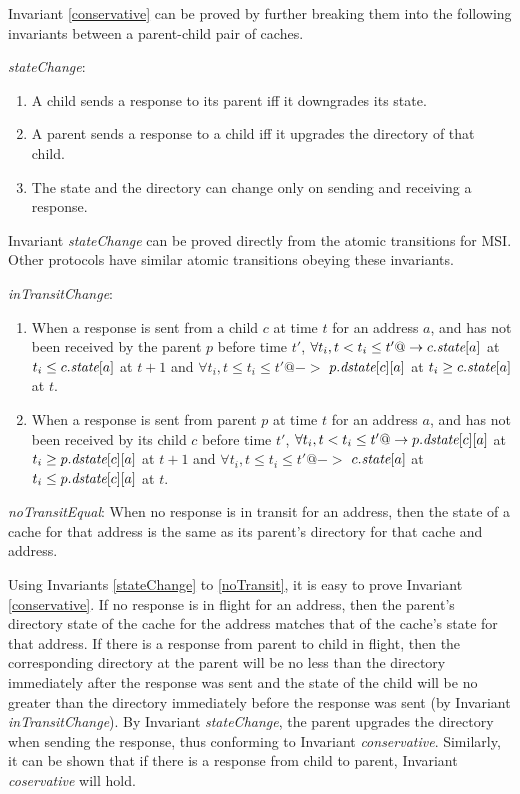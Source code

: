 Invariant \ref{conservative} can be proved by
further breaking them into the following invariants between a parent-child pair
of caches.

\begin{inv}
\textit{stateChange}:
\begin{enumerate}
\item A child sends a response to its parent iff it downgrades its state.
\item A parent sends a response to a child iff it upgrades the directory of
that child.
\item The state and the directory can change only on sending and receiving a
response.
\end{enumerate}
\label{stateChange}
\end{inv}

Invariant \textit{stateChange} can be proved directly from the atomic
transitions for MSI. Other protocols have similar atomic transitions obeying
these invariants.

\begin{inv}
\textit{inTransitChange}:
\begin{enumerate}
\item When a response is sent from a child $c$ at time $t$ for an address $a$,
and has not been received by the parent $p$ before time $t'$, $\forall t_i, t <
t_i \le t' @-> c.\textit{state}[a]$ at $t_i \le c.\textit{state}[a]$ at $t+1$ and $\forall t_i,
t \le t_i \le t' @->$ $p.\textit{dstate}[c][a]$ at $t_i \ge c.\textit{state}[a]$ at $t$.
\item When a response is sent from parent $p$ at time $t$ for an address $a$,
and has not been received by its child $c$ before time $t'$, $\forall t_i, t <
t_i \le t' @-> p.\textit{dstate}[c][a]$ at $t_i \ge p.\textit{dstate}[c][a]$ at $t+1$ and
$\forall t_i, t \le t_i \le t' @->$ $c.\textit{state}[a]$ at $t_i \le p.\textit{dstate}[c][a]$ at
$t$.
\end{enumerate}
\label{inTransitChange}
\end{inv}

\begin{inv}
\textit{noTransitEqual}: When no response is in transit for an address, then
the state of a cache for that address is the same as its parent's directory for
that cache and address.
\label{noTransitEqual}
\end{inv}

Using Invariants \ref{stateChange} to \ref{noTransit}, it is easy to prove
Invariant \ref{conservative}. If no response is in flight for an address, then
the parent's directory state of the cache for the address matches that of the
cache's state for that address. If there is a response from parent to child in
flight, then the corresponding directory at the parent will be no less than the
directory immediately after the response was sent and the state of the child
will be no greater than the directory immediately before the response was sent
(by Invariant \textit{inTransitChange}). By Invariant \textit{stateChange}, the
parent upgrades the directory when sending the response, thus conforming to
Invariant \textit{conservative}. Similarly, it can be shown that if there is a
response from child to parent, Invariant \textit{coservative} will hold.

